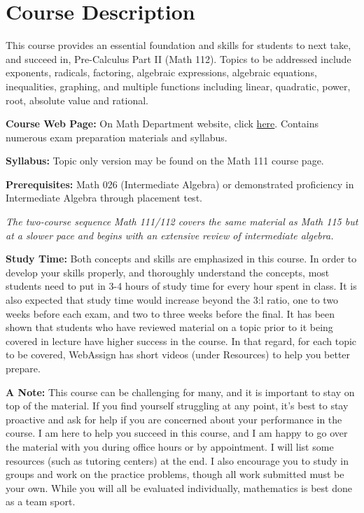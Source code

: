 \documentclass{article}
\begin{document}
\section*{Course Description}
This course provides an essential foundation and skills for students to next take, and succeed in, Pre-Calculus Part II (Math 112). Topics to be addressed include exponents, radicals, factoring, algebraic expressions, algebraic equations, inequalities, graphing, and multiple functions including linear, quadratic, power, root, absolute value and rational. \par
\hfill \par
\noindent \textbf{Course Web Page:} On Math Department website, click \href{https://math.rutgers.edu/academics/undergraduate/courses/927-01-640-111-precalculus-i}{here}. Contains numerous exam preparation materials and syllabus. \par
\hfill \par
\noindent \textbf{Syllabus:} Topic only version may be found on the Math 111 course page. \par
\hfill \par
\noindent \textbf{Prerequisites:} Math 026 (Intermediate Algebra) or demonstrated proficiency in Intermediate Algebra through placement test. \par
\hfill \par
\noindent \textit{The two-course sequence Math 111/112 covers the same material as Math 115 but at a slower pace and begins with an extensive review of intermediate algebra.} \par
\hfill \par
\noindent \textbf{Study Time:} Both concepts and skills are emphasized in this course. In order to develop your skills properly, and thoroughly understand the concepts, most students need to put in 3-4 hours of study time for every hour spent in class. It is also expected that study time would increase beyond the 3:l ratio, one to two weeks before each exam, and two to three weeks before the final. It has been shown that students who have reviewed material on a topic prior to it being covered in lecture have higher success in the course. In that regard, for each topic to be covered, WebAssign has short videos (under Resources) to help you better prepare. 
\par 
\hfill \par
\noindent \textbf{A Note:} This course can be challenging for many, and it is important to stay on top of the material. If you find yourself struggling at any point, it's best to stay proactive and ask for help if you are concerned about your performance in the course. I am here to help you succeed in this course, and I am happy to go over the material with you during office hours or by appointment. I will list some resources (such as tutoring centers) at the end. I also encourage you to study in groups and work on the practice problems, though all work submitted must be your own. While you will all be evaluated individually, mathematics is best done as a team sport. \par
\hfill \par
\end{document}

